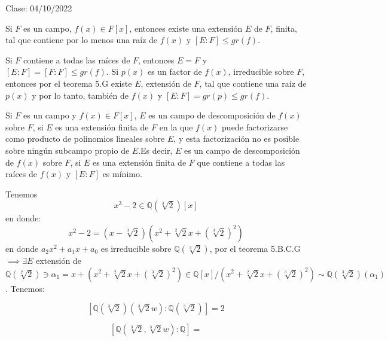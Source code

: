 Clase: 04/10/2022

\begin{corolario}
    Si $F$ es un campo, $f(x)\in F[x]$, entonces existe una extensión $E$ de $F$, finita, tal que contiene por lo menos una raíz de $f(x)$ y $[E:F]\leq gr(f)$.
    \begin{dem}
        Si $F$ contiene a todas las raíces de $F$, entonces $E=F$ y $[E:F]=[F:F]\leq gr(f)$. Si $p(x)$ es un factor de $f(x)$, irreducible sobre $F$, entonces por el teorema 5.G existe $E$, extensión de $F$, tal que contiene una raíz de $p(x)$ y por lo tanto, también de $f(x)$ y $[E:F]=gr(p)\leq gr(f)$.
    \end{dem}
\end{corolario}

\begin{definicion}
    Si $F$ es un campo y $f(x)\in F[x]$, $E$ es un campo de descomposición de $f(x)$ sobre $F$, si $E$ es una extensión finita de $F$ en la que $f(x)$ puede factorizarse como producto de polinomios lineales sobre $E$, y esta factorización no es posible sobre ningún subcampo propio de $E$.\bigbreak Es decir, $E$ es un campo de descomposición de $f(x)$ sobre $F$, si $E$ es una extensión finita de $F$ que contiene a todas las raíces de $f(x)$ y $[E:F]$ es mínimo.  
\end{definicion}

\begin{cajita}
    \begin{ejemplo}
        Tenemos 
        $$x^3-2\in \mathbb{Q}(\sqrt[3]{2})[x]$$
        en donde:
        $$x^2-2=(x-\sqrt[3]{2})(x^2+\sqrt[2]{2}x+(\sqrt[3]{2})^2)$$
        en donde $a_2x^2+a_1x+a_0$ es irreducible sobre $\mathbb{Q}(\sqrt[3]{2})$, por el teorema 5.B.C.G $\implies\exists E$ extensión de $\mathbb{Q}(\sqrt[2]{2})\ni \alpha_1=x+(x^2+\sqrt[2]{2}x+(\sqrt[3]{2})^2)\in \mathbb{Q}[x]/(x^2+\sqrt[2]{2}x+(\sqrt[3]{2})^2)\sim \mathbb{Q}(\sqrt[3]{2})(\alpha_1)$. Tenemos: 

        $$[\mathbb{Q}(\sqrt[3]{2})(\sqrt[3]{2}w):\mathbb{Q}(\sqrt[3]{2})]=2$$

        $$[\mathbb{Q}(\sqrt[3]{2},\sqrt[3]{2}w ):\mathbb{Q}]=$$
    \end{ejemplo}
\end{cajita}

